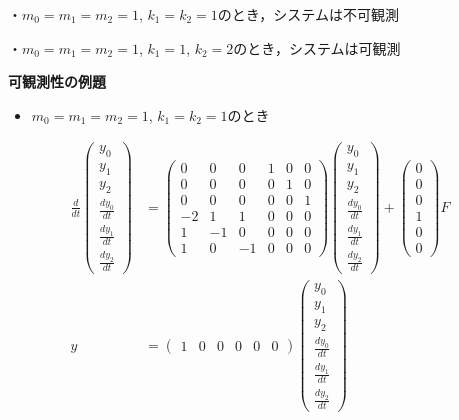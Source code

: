 \documentclass[a4paper,11pt]{jreport}
\begin{document}
・$m_0=m_1=m_2=1$, $k_1=k_2=1$のとき，システムは不可観測

・$m_0=m_1=m_2=1$, $k_1=1$, $k_2=2$のとき，システムは可観測

\newpage
\noindent
{\bf 可観測性の例題}

\begin{itemize}
\item $m_0=m_1=m_2=1$, $k_1=k_2=1$のとき
\end{itemize}
\begin{align}
 \frac{d}{dt} \left(\begin{array}{c}
	         y_0 \\
		     y_1 \\
		     y_2 \\
		     \frac{dy_0}{dt} \\
		     \frac{dy_1}{dt} \\
		     \frac{dy_2}{dt}
		    \end{array}\right)
 &=
 \left(\begin{array}{rrrrrr}
        0 & 0 & 0 & 1 & 0 & 0      \\
        0 & 0 & 0 & 0 & 1 & 0      \\
        0 & 0 & 0 & 0 & 0 & 1      \\
	-2& 1 & 1 & 0 & 0 & 0 \\
	1 & -1& 0 & 0 & 0 & 0 \\
	1 & 0 & -1& 0 & 0 & 0 
       \end{array}\right)
 \left(\begin{array}{c}
	         y_0 \\
		     y_1 \\
		     y_2 \\
		     \frac{dy_0}{dt} \\
		     \frac{dy_1}{dt} \\
		     \frac{dy_2}{dt}
       \end{array}\right)
 +
 \left(\begin{array}{c}
        0 \\
        0 \\
        0 \\
	    1 \\
	    0 \\
	    0 
       \end{array}\right)
        F
\nonumber
\\
y &=
 \left(\begin{array}{cccccc}
         1 & 0 & 0 & 0 & 0 & 0
       \end{array}\right)
 \left(\begin{array}{c}
	         y_0 \\
		     y_1 \\
		     y_2 \\
		     \frac{dy_0}{dt} \\
		     \frac{dy_1}{dt} \\
		     \frac{dy_2}{dt}
       \end{array}\right)
\nonumber
\end{align}
\end{document}
